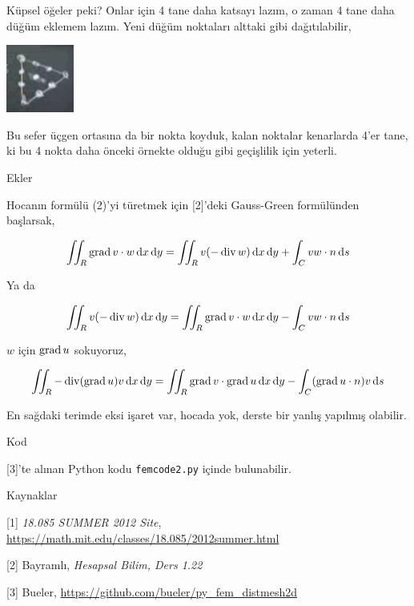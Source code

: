 \documentclass[12pt,fleqn]{article}\usepackage{../../common}
\begin{document}
Küpsel öğeler peki? Onlar için 4 tane daha katsayı lazım, o zaman 4 tane
daha düğüm eklemem lazım. Yeni düğüm noktaları alttaki gibi dağıtılabilir,

\includegraphics[width=6em]{compscieng_1_27_07.png}

Bu sefer üçgen ortasına da bir nokta koyduk, kalan noktalar kenarlarda 4'er
tane, ki bu 4 nokta daha önceki örnekte olduğu gibi geçişlilik için yeterli.

Ekler

Hocanın formülü (2)'yi türetmek için [2]'deki Gauss-Green formülünden başlarsak,

$$
\iint_R \operatorname{grad} v \cdot w  \,\mathrm{d} x \,\mathrm{d} y =
\iint_R v (-\operatorname{div} w) \,\mathrm{d} x \,\mathrm{d} y + \int_C v w \cdot n \,\mathrm{d} s
$$

Ya da

$$
\iint_R v (-\operatorname{div} w) \,\mathrm{d} x \,\mathrm{d} y  =
\iint_R \operatorname{grad} v \cdot w  \,\mathrm{d} x \,\mathrm{d} y - \int_C v w \cdot n \,\mathrm{d} s
$$

$w$ için $\operatorname{grad} u$ sokuyoruz,

$$
\iint_R -\operatorname{div} (\operatorname{grad} u) v \,\mathrm{d} x \,\mathrm{d} y  =
\iint_R \operatorname{grad} v \cdot \operatorname{grad} u  \,\mathrm{d} x \,\mathrm{d} y - \int_C (\operatorname{grad} u \cdot n) v \,\mathrm{d} s
$$

En sağdaki terimde eksi işaret var, hocada yok, derste bir yanlış yapılmış
olabilir.

Kod

[3]'te alınan Python kodu \verb!femcode2.py! içinde bulunabilir.

Kaynaklar

[1] {\em 18.085 SUMMER 2012 Site},
    \url{https://math.mit.edu/classes/18.085/2012summer.html}

[2] Bayramlı, {\em Hesapsal Bilim, Ders 1.22}

[3] Bueler, \url{https://github.com/bueler/py_fem_distmesh2d}
    
\end{document}
